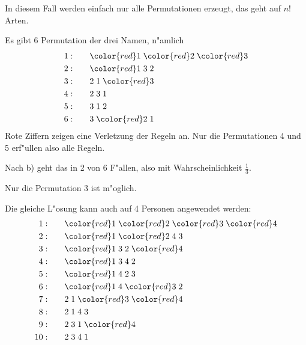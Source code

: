 \begin{loesung}
\begin{teilaufgaben}
\item 
In diesem Fall werden einfach nur alle Permutationen erzeugt,
das geht auf $n!$ Arten.
\item
Es gibt 6 Permutation der drei Namen,  n"amlich
\begin{align*}
1:\qquad&{\color{red}1}\;{\color{red}2}\;{\color{red}3}\\
2:\qquad&{\color{red}1}\;            3 \;            2 \\
3:\qquad&            2 \;            1 \;{\color{red}3}\\
4:\qquad&            2 \;            3 \;            1 \\
5:\qquad&            3 \;            1 \;            2 \\
6:\qquad&            3 \;{\color{red}2}\;            1 
\end{align*}
Rote Ziffern zeigen eine Verletzung der Regeln an.
Nur die Permutationen 4 und 5 erf"ullen also alle Regeln.
\item
Nach b) geht das in 2 von 6 F"allen, also mit Wahrscheinlichkeit $\frac13$.
\item
Nur die Permutation 3 ist m"oglich.
\item
Die gleiche L"osung kann auch auf 4 Personen angewendet werden:
\begin{align*}
 1:\qquad&{\color{red}1}\;{\color{red}2}\;{\color{red}3}\;{\color{red}4}\\
 2:\qquad&{\color{red}1}\;{\color{red}2}\;            4 \;            3 \\
 3:\qquad&{\color{red}1}\;            3 \;            2 \;{\color{red}4}\\
 4:\qquad&{\color{red}1}\;            3 \;            4 \;            2 \\
 5:\qquad&{\color{red}1}\;            4 \;            2 \;            3 \\
 6:\qquad&{\color{red}1}\;            4 \;{\color{red}3}\;            2 \\
%
 7:\qquad&            2 \;            1 \;{\color{red}3}\;{\color{red}4}\\
 8:\qquad&            2 \;            1 \;            4 \;            3 \\
 9:\qquad&            2 \;            3 \;            1 \;{\color{red}4}\\
10:\qquad&            2 \;            3 \;            4 \;            1 \\

\end{align*}
\end{teilaufgaben}
\end{loesung}
